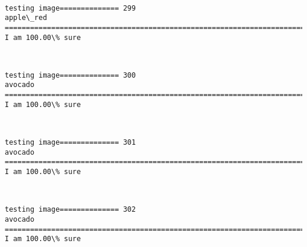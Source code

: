 \documentclass[11pt]{article}
\begin{document}
    \begin{center}
    \end{center}
    { \hspace*{\fill} \\}
    
    \begin{Verbatim}[commandchars=\\\{\}]
testing image============== 299
apple\_red
============================================================================
I am 100.00\% sure

    \end{Verbatim}

    \begin{center}
    \end{center}
    { \hspace*{\fill} \\}
    
    \begin{Verbatim}[commandchars=\\\{\}]
testing image============== 300
avocado
============================================================================
I am 100.00\% sure

    \end{Verbatim}

    \begin{center}
    \end{center}
    { \hspace*{\fill} \\}
    
    \begin{Verbatim}[commandchars=\\\{\}]
testing image============== 301
avocado
============================================================================
I am 100.00\% sure

    \end{Verbatim}

    \begin{center}
    \end{center}
    { \hspace*{\fill} \\}
    
    \begin{Verbatim}[commandchars=\\\{\}]
testing image============== 302
avocado
============================================================================
I am 100.00\% sure

    \end{Verbatim}
\end{document}
